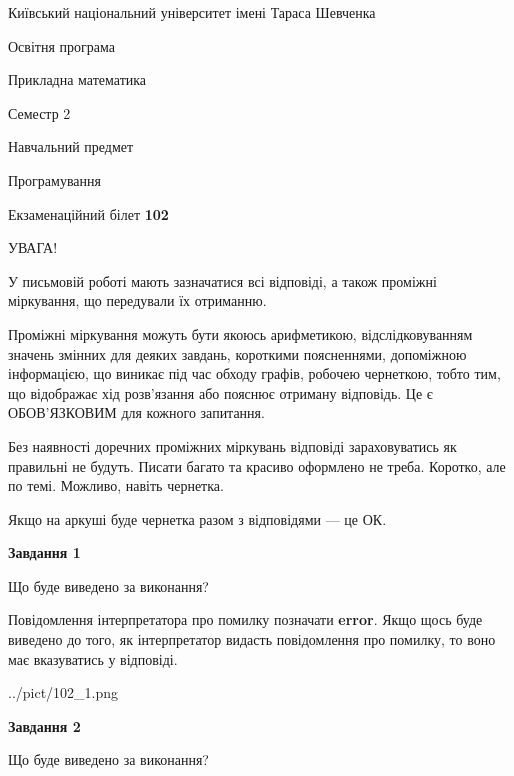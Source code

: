 \documentclass[12pt, ukrainian]{article}
\begin{document}
{{\begin {small}\par
{ \center  Київський національний університет імені Тараса Шевченка \par}
{\parbox {5 cm}{Освітня програма \hfill}{\parbox {7 cm}{Прикладна математика \hfill}}\parbox {6 cm}{\hfill Семестр 2}}\par
{\parbox {5 cm} {Навчальний предмет \hfill}\parbox {7 cm}{Програмування \hfill}\parbox {6cm}{\hfill}\par}\vspace{-7pt} \end{small}}{\center Екзаменаційний білет \No \textbf
{ 102 }\par}}
{
\begin {large}
УВАГА!

У письмовій роботі мають зазначатися всі відповіді, а також проміжні міркування, що передували їх отриманню.

Проміжні міркування можуть бути якоюсь арифметикою, відслідковуванням зна\-чень змінних для деяких завдань,
короткими поясненнями, допоміжною інформацією, що виникає під час обходу графів, робочею чернеткою,
тобто тим, що відображає хід розв’язання або пояснює отриману відповідь.
Це є ОБОВ’ЯЗКОВИМ для кожного запитання.

Без наявності доречних проміжних міркувань відповіді зараховуватись як правиль\-ні не будуть.
Писати багато та красиво оформлено не треба. Коротко, але по темі. Можли\-во, навіть чернетка.

Якщо на аркуші буде чернетка разом з відповідями --- це ОК.

\newpage

{\begin {center}\textbf{Завдання 1}\end {center}}\par
Що буде виведено за виконання?

Повідомлення інтерпретатора про помилку позначати \textbf{error}.
Якщо щось буде виведено до того, як інтерпретатор видасть повідомлення про помилку, 
то воно має вказуватись у відповіді. \par


\begin{center}
	{../pict/102_1.png}
\end{center}
\newpage

{\begin {center}\textbf{Завдання 2}\end {center}}\par
Що буде виведено за виконання?


\end{large}}
\end{document}

